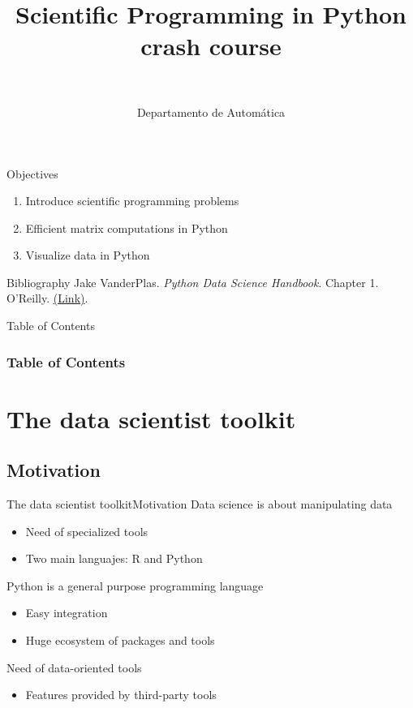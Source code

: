 \documentclass[10pt,compress]{beamer} %
\title[Scientific programming crash course]{Scientific Programming in Python crash course}
\author{\asignatura\\\carrera}
\institute{}
\date{Departamento de Automática}
\begin{document}
{\titlepageBlue
    \begin{frame}
        \titlepage
    \end{frame}
}

\institute{\asignatura}

\begin{frame}[plain]{}
	\begin{block}{Objectives}
		\begin{enumerate}
		\item Introduce scientific programming problems
		\item Efficient matrix computations in Python
		\item Visualize data in Python
		\end{enumerate}
	\end{block}

   \begin{block}{Bibliography}
       Jake VanderPlas. \textit{Python Data Science Handbook}. Chapter 1. O'Reilly. \href{https://jakevdp.github.io/PythonDataScienceHandbook/}{(Link)}.
   \end{block}

\end{frame}

{
\begin{frame}[shrink]{Table of Contents}
 \frametitle{Table of Contents}
 \begin{multicols}{2}
 \tableofcontents
 \end{multicols}
\end{frame}
}

\section{The data scientist toolkit}

\subsection{Motivation}

\begin{frame}{The data scientist toolkit}{Motivation}
	Data science is about manipulating data
	\begin{itemize}
		\item Need of specialized tools
		\item Two main languajes: R and Python
	\end{itemize}
	Python is a general purpose programming language
	\begin{itemize}
		\item Easy integration 
		\item Huge ecosystem of packages and tools
	\end{itemize}
	Need of data-oriented tools
	\begin{itemize}
		\item Features provided by third-party tools
	\end{itemize}
\end{frame}
\end{document}
